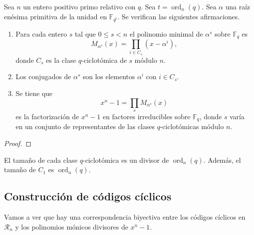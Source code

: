 \begin{theorem}
  Sea \(n\) un entero positivo primo relativo con \(q\).
  Sea \(t = \operatorname{ord}_n(q)\).
  Sea \(\alpha\) una raíz enésima primitiva de la unidad en \(\mathbb F_{q^t}\).
  Se verifican las siguientes afirmaciones.
  \begin{enumerate}
    \item Para cada entero \(s\) tal que \(0 \leq s < n\) el polinomio minimal de \(\alpha^s\) sobre \(\mathbb F_q\) es
    \[
      M_{\alpha^s}(x) = \prod_{i \in C_s}(x - \alpha^i),
    \]
    donde \(C_s\) es la clase \(q\)-ciclotómica de \(s\) módulo \(n\).
    \item Los conjugados de \(\alpha^s\) son los elementos \(\alpha^i\) con \(i \in C_s\).
    \item Se tiene que
    \[
      x^n - 1 = \prod_s M_{\alpha^s}(x)
    \]
    es la factorización de \(x^n - 1\) en factores irreducibles sobre \(\mathbb F_q\), donde \(s\) varía en un conjunto de representantes de las clases \(q\)-ciclotómicas módulo \(n\).
  \end{enumerate}
\end{theorem}

\begin{proof}
\end{proof}

\begin{theorem}
  El tamaño de cada clase \(q\)-ciclotómica es un divisor de \(\operatorname{ord}_n(q)\).
  Además, el tamaño de \(C_1\) es \(\operatorname{ord}_n(q)\).
\end{theorem}

\subsection{Construcción de códigos cíclicos}

Vamos a ver que hay una correspondencia biyectiva entre los códigos cíclicos en \(\mathcal R_n\) y los polinomios mónicos divisores de \(x^n-1\).

